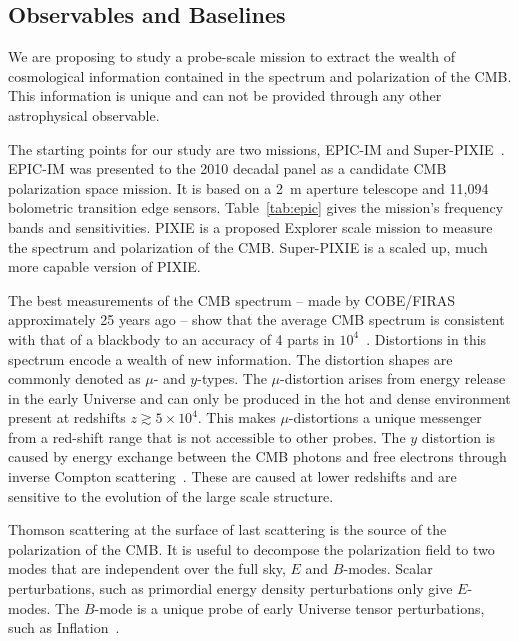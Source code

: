 
\subsection{Observables and Baselines}
\label{sec:observables}

\vspace{-0.05in}

We are proposing to study a probe-scale mission to extract the wealth 
of cosmological information contained in the spectrum and polarization of the \ac{CMB}. This information is unique
and can not be provided through any other astrophysical observable. 

The starting points for our study are 
two missions, EPIC-IM and Super-PIXIE~\cite{epic_im,pixie}. EPIC-IM was presented 
to the 2010 decadal panel as a candidate \ac{CMB} polarization space mission. It is based on a 2~m aperture telescope 
and 11,094 bolometric transition edge sensors. Table~\ref{tab:epic} gives the mission's frequency bands and sensitivities. 
PIXIE is a proposed Explorer scale mission to measure the spectrum and polarization of the CMB. Super-PIXIE is a scaled up, 
much more capable version of PIXIE.

The best measurements of the \ac{CMB} spectrum -- made by COBE/FIRAS approximately 25 years ago --
show that the average CMB spectrum is consistent with that of a blackbody to an accuracy of 4 parts 
in $10^{4}$~\cite{Mather1994, Fixsen1996}. Distortions in this spectrum encode a wealth of new information.
The distortion shapes are commonly denoted as $\mu$- and $y$-types. The 
$\mu$-distortion arises from energy release in the early Universe and can only be produced in the hot and dense 
environment present at redshifts $z\gtrsim 5\times10^4$. This makes $\mu$-distortions a unique messenger from a red-shift 
range that is not accessible to other probes. The $y$ distortion is caused by 
energy exchange between the \ac{CMB} photons and free electrons through inverse Compton 
scattering~\cite{Zeldovich1969, Sunyaev1970mu}. These are caused at lower redshifts and are sensitive to the 
evolution of the large scale structure. 

Thomson scattering at the surface of last scattering is the source of the polarization of the \ac{CMB}. It is useful 
to decompose the polarization field to two modes that are independent over the full sky, $E$ and $B$-modes. Scalar perturbations, 
such as primordial energy density perturbations only give $E$-modes. The $B$-mode is a unique probe of early Universe 
tensor perturbations, such as Inflation~\cite{kamionkowski97a,zaldarriaga97}. 

